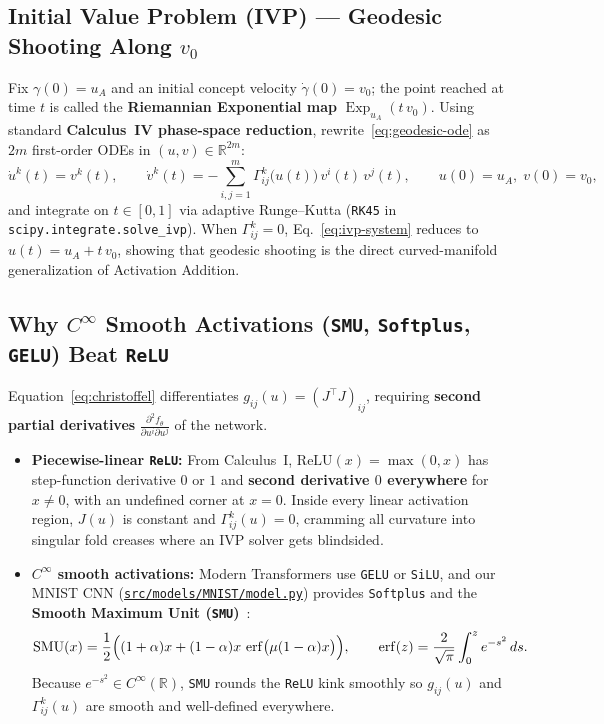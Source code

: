\documentclass[11pt,a4paper]{article}
\newcommand{\R}{\mathbb{R}}
\DeclareMathOperator{\Exp}{Exp}
\DeclareMathOperator{\erf}{erf}
\theoremstyle{definition}
\begin{document}
\subsection{Initial Value Problem (IVP) --- Geodesic Shooting Along \texorpdfstring{$v_0$}{v\_0}}

Fix $\gamma(0) = u_A$ and an initial concept velocity $\dot{\gamma}(0) = v_0$; the point reached at time $t$ is called the \textbf{Riemannian Exponential map} $\Exp_{u_A}(t\,v_0)$. Using standard \textbf{Calculus~IV phase-space reduction}, rewrite~\eqref{eq:geodesic-ode} as $2m$ first-order ODEs in $(u, v) \in \R^{2m}$:
\begin{equation}
    \dot{u}^k(t) = v^k(t), \qquad \dot{v}^k(t) = -\sum_{i,j=1}^m \Gamma^k_{ij}\bigl(u(t)\bigr)\,v^i(t)\,v^j(t), \qquad u(0) = u_A,\; v(0) = v_0,
    \label{eq:ivp-system}
\end{equation}
and integrate on $t \in [0, 1]$ via adaptive Runge--Kutta (\texttt{RK45} in \texttt{scipy.integrate.solve\_ivp}). When $\Gamma^k_{ij} = 0$, Eq.~\eqref{eq:ivp-system} reduces to $u(t) = u_A + t\,v_0$, showing that geodesic shooting is the direct curved-manifold generalization of Activation Addition.

\subsection{Why \texorpdfstring{$C^\infty$}{C-infinity} Smooth Activations (\texttt{SMU}, \texttt{Softplus}, \texttt{GELU}) Beat \texttt{ReLU}}

Equation~\eqref{eq:christoffel} differentiates $g_{ij}(u) = (J^\top J)_{ij}$, requiring \textbf{second partial derivatives} $\frac{\partial^2 f_\theta}{\partial u^i \partial u^j}$ of the network.
\begin{itemize}[leftmargin=*]
    \item \textbf{Piecewise-linear \texttt{ReLU}:} From Calculus~I, $\mathrm{ReLU}(x) = \max(0, x)$ has step-function derivative $0$ or $1$ and \textbf{second derivative $0$ everywhere} for $x \neq 0$, with an undefined corner at $x = 0$. Inside every linear activation region, $J(u)$ is constant and $\Gamma^k_{ij}(u) = 0$, cramming all curvature into singular fold creases where an IVP solver gets blindsided.
    \item \textbf{$C^\infty$ smooth activations:} Modern Transformers use \texttt{GELU} or \texttt{SiLU}, and our MNIST CNN (\href{run:../src/models/MNIST/model.py}{\texttt{src/models/MNIST/model.py}}) provides \texttt{Softplus} and the \textbf{Smooth Maximum Unit (\texttt{SMU})}~\cite{biswas2022smu}:
    \[
        \mathrm{SMU}(x) = \frac{1}{2}\Bigl((1 + \alpha)x + (1 - \alpha)x\,\erf\bigl(\mu(1 - \alpha)x\bigr)\Bigr), \qquad \erf(z) = \frac{2}{\sqrt{\pi}}\int_0^z e^{-s^2}\,ds.
    \]
    Because $e^{-s^2} \in C^\infty(\R)$, \texttt{SMU} rounds the \texttt{ReLU} kink smoothly so $g_{ij}(u)$ and $\Gamma^k_{ij}(u)$ are smooth and well-defined everywhere.
\end{itemize}
\end{document}
